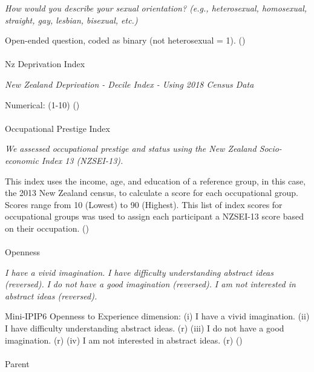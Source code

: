 \documentclass[
  single column]{article}
\makeatletter
\let\oldparagraph\paragraph
\renewcommand{\paragraph}{
    \@ifstar
      \xxxParagraphStar
      \xxxParagraphNoStar
  }
\newcommand{\xxxParagraphStar}[1]{\oldparagraph*{#1}\mbox{}}
\newcommand{\xxxParagraphNoStar}[1]{\oldparagraph{#1}\mbox{}}
\makeatother
\begin{document}
\emph{How would you describe your sexual orientation? (e.g.,
heterosexual, homosexual, straight, gay, lesbian, bisexual, etc.)}

Open-ended question, coded as binary (not heterosexual = 1).
()

\paragraph{Nz Deprivation Index}\label{nz-deprivation-index}

\emph{New Zealand Deprivation - Decile Index - Using 2018 Census Data}

Numerical: (1-10) ()

\paragraph{Occupational Prestige
Index}\label{occupational-prestige-index}

\emph{We assessed occupational prestige and status using the New Zealand
Socio-economic Index 13 (NZSEI-13).}

This index uses the income, age, and education of a reference group, in
this case, the 2013 New Zealand census, to calculate a score for each
occupational group. Scores range from 10 (Lowest) to 90 (Highest). This
list of index scores for occupational groups was used to assign each
participant a NZSEI-13 score based on their occupation.
()

\paragraph{Openness}\label{openness}

\emph{I have a vivid imagination.} \emph{I have difficulty understanding
abstract ideas (reversed).} \emph{I do not have a good imagination
(reversed).} \emph{I am not interested in abstract ideas (reversed).}

Mini-IPIP6 Openness to Experience dimension: (i) I have a vivid
imagination. (ii) I have difficulty understanding abstract ideas. (r)
(iii) I do not have a good imagination. (r) (iv) I am not interested in
abstract ideas. (r) ()

\paragraph{Parent}\label{parent}
\end{document}
